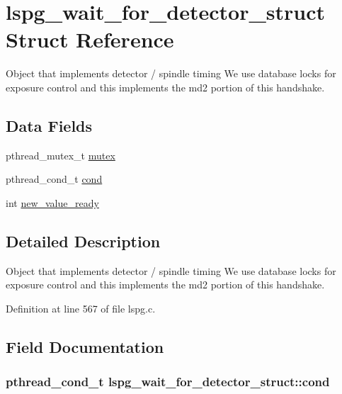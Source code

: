 \hypertarget{structlspg__wait__for__detector__struct}{\section{lspg\-\_\-wait\-\_\-for\-\_\-detector\-\_\-struct Struct Reference}
\label{structlspg__wait__for__detector__struct}
}


Object that implements detector / spindle timing We use database locks for exposure control and this implements the md2 portion of this handshake.  


\subsection*{Data Fields}
\begin{DoxyCompactItemize}
\item 
pthread\-\_\-mutex\-\_\-t \hyperlink{structlspg__wait__for__detector__struct_a958e9fe59e671e61f95c2ce796ba24ce}{mutex}
\item 
pthread\-\_\-cond\-\_\-t \hyperlink{structlspg__wait__for__detector__struct_aa97388f93ca5099196ba0da1e4a5b7bb}{cond}
\item 
int \hyperlink{structlspg__wait__for__detector__struct_ad950e85c70c4473c5c7c40f8ceeae61d}{new\-\_\-value\-\_\-ready}
\end{DoxyCompactItemize}


\subsection{Detailed Description}
Object that implements detector / spindle timing We use database locks for exposure control and this implements the md2 portion of this handshake. 

Definition at line 567 of file lspg.\-c.



\subsection{Field Documentation}
\hypertarget{structlspg__wait__for__detector__struct_aa97388f93ca5099196ba0da1e4a5b7bb}{
\subsubsection[{cond}]{\setlength{\rightskip}{0pt plus 5cm}pthread\-\_\-cond\-\_\-t lspg\-\_\-wait\-\_\-for\-\_\-detector\-\_\-struct\-::cond}}\label{structlspg__wait__for__detector__struct_aa97388f93ca5099196ba0da1e4a5b7bb}


